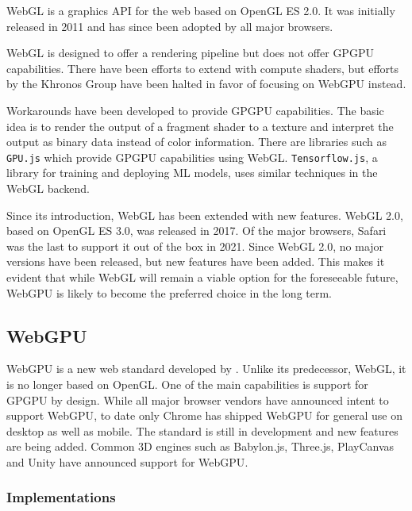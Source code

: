 \gls{WebGL} is a graphics \gls{API} for the web based on \gls{OpenGL ES} 2.0. It was initially released in 2011 and has since been adopted by all major browsers.

\gls{WebGL} is designed to offer a rendering pipeline but does not offer \gls{GPGPU} capabilities. There have been efforts to extend with compute shaders, but efforts by the \gls{Khronos Group} have been halted in favor of focusing on \gls{WebGPU} instead.

Workarounds have been developed to provide \gls{GPGPU} capabilities. The basic idea is to render the output of a fragment shader to a texture and interpret the output as binary data instead of color information. There are libraries such as \texttt{GPU.js} which provide \gls{GPGPU} capabilities using \gls{WebGL}. \texttt{Tensorflow.js}, a library for training and deploying \gls{ML} models, uses similar techniques in the \gls{WebGL} backend.

Since its introduction, \gls{WebGL} has been extended with new features. \gls{WebGL} 2.0, based on \gls{OpenGL ES} 3.0, was released in 2017. Of the major browsers, Safari was the last to support it out of the box in 2021. Since \gls{WebGL} 2.0, no major versions have been released, but new features have been added. This makes it evident that while \gls{WebGL} will remain a viable option for the foreseeable future, \gls{WebGPU} is likely to become the preferred choice in the long term.

\subsection*{WebGPU}

\gls{WebGPU} is a new web standard developed by  \cite{webgpuSpecification}. Unlike its predecessor, \gls{WebGL}, it is no longer based on \gls{OpenGL}. One of the main capabilities is support for \gls{GPGPU} by design. While all major browser vendors have announced intent to support \gls{WebGPU}, to date only Chrome has shipped \gls{WebGPU} for general use on desktop as well as mobile.
The standard is still in development and new features are being added.
Common 3D engines such as \gls{Babylon.js}, \gls{Three.js}, \gls{PlayCanvas} and \gls{Unity} have announced support for \gls{WebGPU}.

\subsubsection{Implementations}

